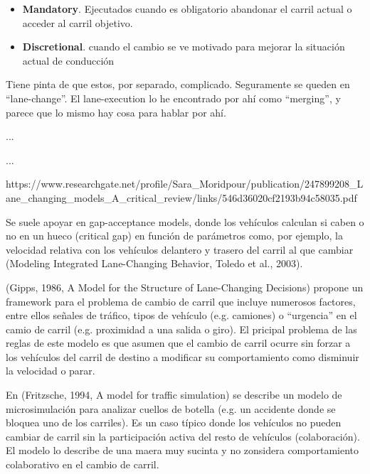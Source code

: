 \begin{itemize}
	\item \textbf{Mandatory}. Ejecutados cuando es obligatorio abandonar el carril actual o acceder al carril objetivo.
	\item \textbf{Discretional}. cuando el cambio se ve motivado para mejorar la situación actual de conducción 
\end{itemize}





Tiene pinta de que estos, por separado, complicado. Seguramente se queden en \enquote{lane-change}. El lane-execution lo he encontrado por ahí como \enquote{merging}, y parece que lo mismo hay cosa para hablar por ahí.

 ...

 ...



https://www.researchgate.net/profile/Sara\_Moridpour/publication/247899208\_Lane\_changing\_models\_A\_critical\_review/links/546d36020cf2193b94c58035.pdf


Se suele apoyar en gap-acceptance models, donde los vehículos calculan si caben o no en un hueco (critical gap) en función de parámetros como, por ejemplo, la velocidad relativa con los vehículos delantero y trasero del carril al que cambiar (Modeling Integrated Lane-Changing Behavior, Toledo et al., 2003).






(Gipps, 1986, A Model for the Structure of Lane-Changing Decisions) propone un framework para el problema de cambio de carril que incluye numerosos factores, entre ellos señales de tráfico, tipos de vehículo (e.g. camiones) o \enquote{urgencia} en el camio de carril (e.g. proximidad a una salida o giro). El pricipal problema de las reglas de este modelo es que asumen que el cambio de carril ocurre sin forzar a los vehículos del carril de destino a modificar su comportamiento como disminuir la velocidad o parar.

En (Fritzsche, 1994, A model for traffic simulation) se describe un modelo de microsimulación para analizar cuellos de botella (e.g. un accidente donde se bloquea uno de los carriles). Es un caso típico donde los vehículos no pueden cambiar de carril sin la participación activa del resto de vehículos (colaboración). El modelo lo describe de una maera muy sucinta y no zonsidera comportamiento colaborativo en el cambio de carril.

